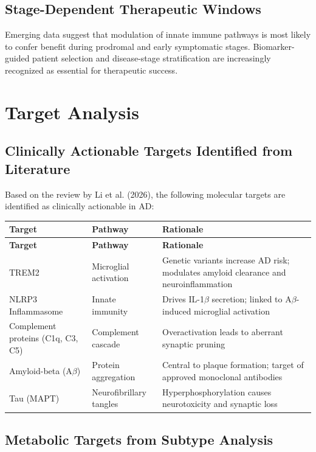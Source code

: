 \documentclass[11pt, a4paper]{article}
\begin{document}
\subsection{Stage-Dependent Therapeutic Windows}

Emerging data suggest that modulation of innate immune pathways is most likely to confer benefit during prodromal and early symptomatic stages. Biomarker-guided patient selection and disease-stage stratification are increasingly recognized as essential for therapeutic success.

\section{Target Analysis}
\label{sec:targets}

\subsection{Clinically Actionable Targets Identified from Literature}

Based on the review by Li et al. (2026), the following molecular targets are identified as clinically actionable in AD:

\begin{longtable}{p{4cm} p{4cm} p{6cm}}
\toprule
\textbf{Target} & \textbf{Pathway} & \textbf{Rationale} \\
\midrule
\endfirsthead
\toprule
\textbf{Target} & \textbf{Pathway} & \textbf{Rationale} \\
\midrule
\endhead
\bottomrule
\endfoot
TREM2 & Microglial activation & Genetic variants increase AD risk; modulates amyloid clearance and neuroinflammation \\
NLRP3 Inflammasome & Innate immunity & Drives IL-1$\beta$ secretion; linked to A$\beta$-induced microglial activation \\
Complement proteins (C1q, C3, C5) & Complement cascade & Overactivation leads to aberrant synaptic pruning \\
Amyloid-beta (A$\beta$) & Protein aggregation & Central to plaque formation; target of approved monoclonal antibodies \\
Tau (MAPT) & Neurofibrillary tangles & Hyperphosphorylation causes neurotoxicity and synaptic loss \\
\bottomrule
\end{longtable}

\subsection{Metabolic Targets from Subtype Analysis}
\end{document}
